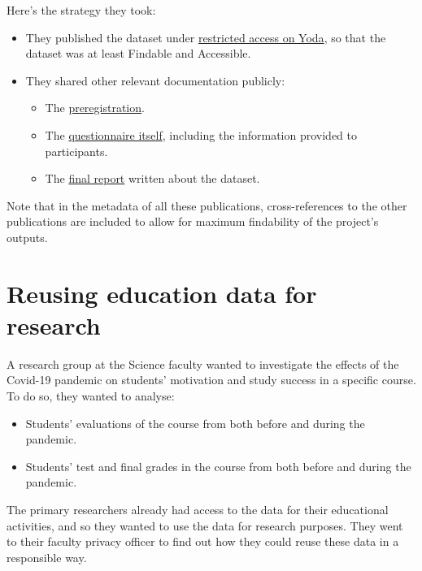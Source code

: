 \documentclass[
]{book}
\providecommand{\tightlist}{%
  \setlength{\itemsep}{0pt}\setlength{\parskip}{0pt}}
\begin{document}
Here's the strategy they took:

\begin{itemize}
\tightlist
\item
  They published the dataset under
  \href{https://doi.org/10.24416/UU01-3L9K99}{restricted access on Yoda},
  so that the dataset was at least Findable and Accessible.
\item
  They shared other relevant documentation publicly:

  \begin{itemize}
  \tightlist
  \item
    The \href{https://doi.org/10.5281/zenodo.5727106}{preregistration}.
  \item
    The \href{https://doi.org/10.5281/zenodo.5727057}{questionnaire itself},
    including the information provided to participants.
  \item
    The \href{https://doi.org/10.5281/zenodo.5725177}{final report}
    written about the dataset.
  \end{itemize}
\end{itemize}

Note that in the metadata of all these publications, cross-references to the
other publications are included to allow for maximum findability of the
project's outputs.

\hypertarget{reuse-education-data}{%
\chapter{Reusing education data for research}\label{reuse-education-data}}

A research group at the Science faculty wanted to investigate the effects of the
Covid-19 pandemic on students' motivation and study success in a specific course.
To do so, they wanted to analyse:

\begin{itemize}
\tightlist
\item
  Students' evaluations of the course from both before and during the pandemic.
\item
  Students' test and final grades in the course from both before and during the pandemic.
\end{itemize}

The primary researchers already had access to the data for their educational
activities, and so they wanted to use the data for research purposes. They went
to their faculty privacy officer to find out how they could reuse these data in
a responsible way.
\end{document}
